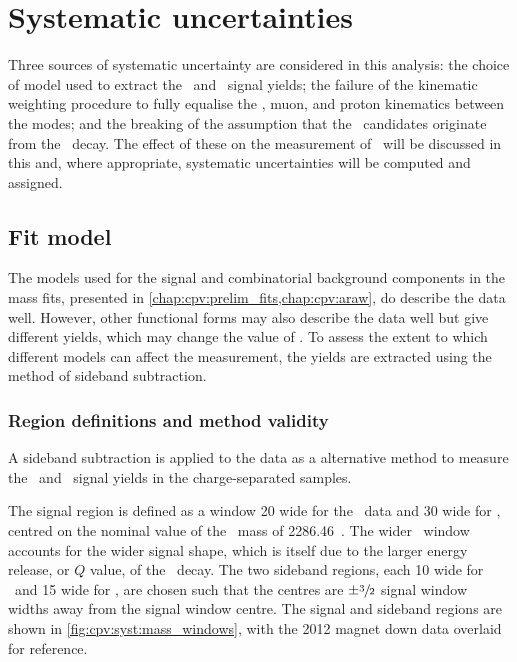 \chapter{Systematic uncertainties}
\label{chap:cpv:syst}

Three sources of systematic uncertainty are considered in this analysis: the
choice of model used to extract the \PLambdac\ and \APLambdac\ signal yields;
the failure of the kinematic weighting procedure to fully equalise the
\PLambdab, muon, and proton kinematics between the modes; and the breaking of
the assumption that the \PLambdac\ candidates originate from the \LbToLcmuX\
decay.
The effect of these on the measurement of \dACP\ will be discussed in this
\lcnamecref{chap:cpv:syst} and, where appropriate, systematic uncertainties
will be computed and assigned.

\section{Fit model}
\label{chap:cpv:syst:fit}

The models used for the signal and combinatorial background components in the
mass fits, presented in \cref{chap:cpv:prelim_fits,chap:cpv:araw}, do describe
the data well.
However, other functional forms may also describe the data well but give
different yields, which may change the value of \dACP\@.
To assess the extent to which different models can affect the measurement, the
yields are extracted using the method of sideband subtraction.

\subsection{Region definitions and method validity}
\label{chap:cpv:syst:fit:defs}

A sideband subtraction is applied to the data as a alternative method to
measure the \pKK\ and \ppipi\ signal yields in the charge-separated samples.

The signal region is defined as a window \SI{20}{\MeVcc} wide for the \pKK\
data and \SI{30}{\MeVcc} wide for \ppipi, centred on the nominal value of the
\PLambdac\ mass of \SI{2286.46}{\MeVcc}~\cite{PDG2014}.
The wider \ppipi\ window accounts for the wider signal shape, which is itself
due to the larger energy release, or $Q$ value, of the \ppipi\ decay.
The two sideband regions, each \SI{10}{\MeVcc} wide for \pKK\ and
\SI{15}{\MeVcc} wide for \ppipi, are chosen such that the centres are
$\pm\sfrac{3}{2}$ signal window widths away from the signal window centre.
The signal and sideband regions are shown in \cref{fig:cpv:syst:mass_windows},
with the 2012 magnet down data overlaid for reference.

